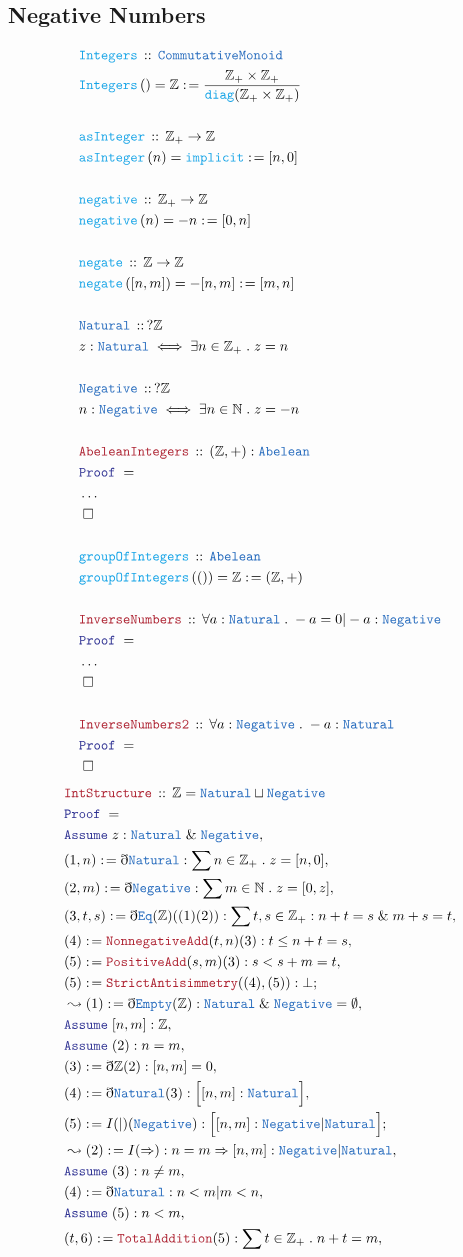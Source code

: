 \documentclass[12pt]{scrartcl}
\newcommand{\TYPE}[1]{\textcolor{NavyBlue}{\mathtt{#1}}}
\newcommand{\FUNC}[1]{\textcolor{Cerulean}{\mathtt{#1}}}
\newcommand{\LOGIC}[1]{\textcolor{Blue}{\mathtt{#1}}}
\newcommand{\THM}[1]{\textcolor{Maroon}{\mathtt{#1}}}
\renewcommand{\.}{\; . \;}
\newcommand{\de}{: \kern 0.1pc =}
\newcommand{\Act}[1]{\left( #1 \right)}
\newcommand{\Theorem}[2]{& \THM{#1} \, :: \, #2 \\ & \Proof = \\ }
\newcommand{\DeclareType}[2]{& \TYPE{#1} \, :: \, #2 \\}
\newcommand{\DefineType}[3]{& #1 : \TYPE{#2} \iff #3 \\}
\newcommand{\DeclareFunc}[2]{& \FUNC{#1} \, :: \, #2 \\}
\newcommand{\DefineNamedFunc}[4]{&  \FUNC{#1}\Act{#2} = #3 \de #4 \\}
\newcommand{\Page}[1]{ \begin{align*} #1 \end{align*}   }
\newcommand{ \bd }{ \ByDef }
\newcommand{\NoProof}{ & \ldots \\ \EndProof}
\renewcommand{\And}{\; \& \;}
\newcommand{\Int}{\mathbb{Z} }
\newcommand{\Nat}{\mathbb{N} }
\newcommand{\Say}[3]{& #1 \de #2 : #3, \\}
\newcommand{\Conclude}[3]{& #1 \de #2 : #3; \\}
\newcommand{\Derive}[3]{& \leadsto #1 \de #2 : #3, \\}
\newcommand{\Assume}[2]{& \LOGIC{Assume} \; #1 : #2, \\}
\newcommand{\QED}{\; \square}
\newcommand{\EndProof}{& \QED \\}
\newcommand{\ByDef}{\eth}
\newcommand{\Proof}{\LOGIC{Proof} \; }
\begin{document}
\subsection{Negative Numbers}
\Page{
	\DeclareFunc{Integers}{\TYPE{CommutativeMonoid}}
	\DefineNamedFunc{Integers}{}{\Int}{\frac{\Int_+ \times \Int_+}{\FUNC{diag}(\Int_+\times\Int_+)}}
	\\
	\DeclareFunc{asInteger}{\Int_+ \to \Int}
	\DefineNamedFunc{asInteger}{n}{\FUNC{implicit}}{[n,0]}
	\\
	\DeclareFunc{negative}{\Int_+ \to \Int}
	\DefineNamedFunc{negative}{n}{-n}{[0,n]}
	\\
	\DeclareFunc{negate}{\Int \to \Int}
	\DefineNamedFunc{negate}{[n,m]}{-[n,m]}{[m,n]}
	\\
	\DeclareType{Natural}{?\Int}
	\DefineType{z}{Natural}{\exists n \in \Int_+ \. z = n}
	\\
	\DeclareType{Negative}{?\Int}
	\DefineType{n}{Negative}{\exists n \in \Nat \. z = -n }
	\\
	\Theorem{AbeleanIntegers}{(\Int,+) : \TYPE{Abelean}}
	\NoProof
	\\
	\DeclareFunc{groupOfIntegers}{\TYPE{Abelean}}
	\DefineNamedFunc{groupOfIntegers}{()}{\Int}{(\Int,+)}
	\\
	\Theorem{InverseNumbers}{\forall a : \TYPE{Natural} \. -a = 0 | -a : \TYPE{Negative}}
	\NoProof
	\\
	\Theorem{InverseNumbers2}{\forall a : \TYPE{Negative} \. -a : \TYPE{Natural}}
	\EndProof
}\Page{
	\Theorem{IntStructure}{\Int = \TYPE{Natural} \sqcup \TYPE{Negative}}
	\Assume{z}{\TYPE{Natural} \And \TYPE{Negative}}
	\Say{(1,n)}{\bd \TYPE{Natural}}{ \sum n \in \Int_+ \. z = [n,0] }
	\Say{(2,m)}{\bd \TYPE{Negative}}{\sum m \in \Nat \. z = [0,z] }
	\Say{(3,t,s)}{\bd \TYPE{Eq}(\Int)((1)(2))}{ \sum t,s \in \Int_+ : n + t = s \And m + s = t }
	\Say{(4)}{\THM{NonnegativeAdd}(t,n)(3)}{ t \le n + t = s  }
	\Say{(5)}{\THM{PositiveAdd}(s,m)(3)}{s < s + m = t }
	\Conclude{(5)}{\THM{StrictAntisimmetry}((4),(5))}{\bot}
	\Derive{(1)}{\bd \TYPE{Empty}(\Int)}{ \TYPE{Natural} \And \TYPE{Negative} = \emptyset}
	\Assume{[n,m]}{\Int}
	\Assume{(2)}{n = m}
	\Say{(3)}{\bd \Int(2)}{[n, m] = 0}
	\Say{(4)}{ \bd \TYPE{Natural}(3)  }{ \Big[ [n,m] : \TYPE{Natural} \Big] }
	\Conclude{(5)}{I(|)(\TYPE{Negative})}{ \Big[ [n,m] :  \TYPE{Negative} | \TYPE{Natural} \Big]     }
	\Derive{(2)}{I(\Rightarrow)}{ n = m \Rightarrow [n,m] : \TYPE{Negative} | \TYPE{Natural} }
	\Assume{(3)}{ n \neq m}
	\Say{(4)}{ \bd \TYPE{Natural}  }{ n < m | m < n  }
	\Assume{(5)}{n < m}
	\Say{(t,6)}{\THM{TotalAddition}(5)}{ \sum t \in \Int_+ \. n + t = m    }
}
\end{document}
